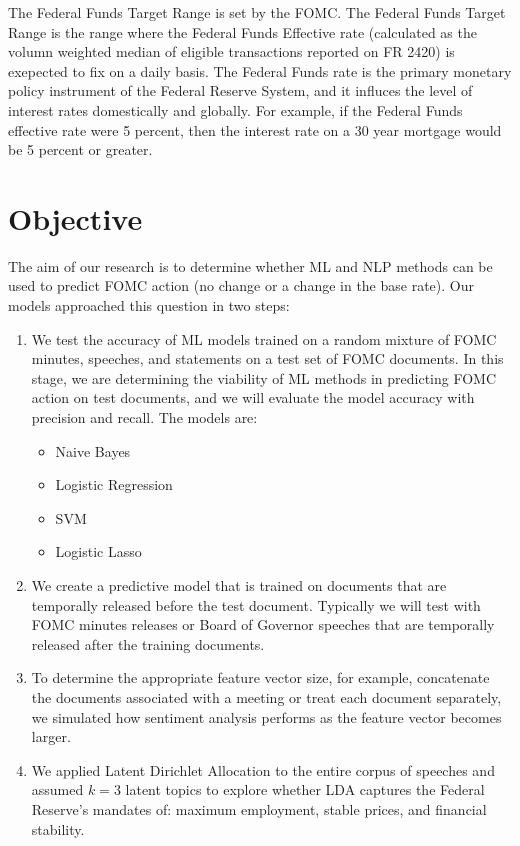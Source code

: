 \documentclass[11pt]{article}
\begin{document}
The Federal Funds Target Range is set by the FOMC.  The Federal Funds Target Range is the range where the Federal Funds Effective rate (calculated as the volumn weighted median of eligible transactions reported on FR 2420) is exepected to fix on a daily basis.  The Federal Funds rate is the primary monetary policy instrument of the Federal Reserve System, and it influces the level of interest rates domestically and globally.  For example, if the Federal Funds effective rate were 5 percent, then the interest rate on a 30 year mortgage would be 5 percent or greater.  

\section{Objective}

The aim of our research is to determine whether ML and NLP methods can be used to predict FOMC action (no change or a change in the base rate).  Our models approached this question in two steps: 

\begin{enumerate}

 \item We test the accuracy of ML models trained on a random mixture of FOMC minutes, speeches, and statements on a test set of FOMC documents.  In this stage, we are determining the viability of ML methods in predicting FOMC action on test documents, and we will evaluate the model accuracy with precision and recall.  The models are: 
 \begin{itemize}
    \item Naive Bayes
    \item Logistic Regression 
    \item SVM
    \item Logistic Lasso
 \end{itemize}
 \item We create a predictive model that is trained on documents that are temporally released before the test document.  Typically we will test with FOMC minutes releases or Board of Governor speeches that are temporally released after the training documents. 
 \item  To determine the appropriate feature vector size, for example, concatenate the documents associated with a meeting or treat each document separately, we simulated how sentiment analysis performs as the feature vector becomes larger. 
 \item  We applied Latent Dirichlet Allocation to the entire corpus of speeches and assumed $k=3$ latent topics to explore whether LDA captures the Federal Reserve's mandates of: maximum employment, stable prices, and financial stability. 
\end{enumerate}
\end{document}
